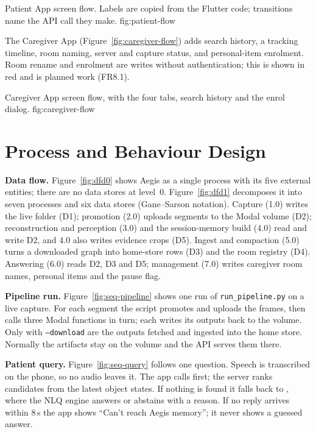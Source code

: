   {Patient App screen flow. Labels are copied from the Flutter code;
   transitions name the API call they make.}
  {fig:patient-flow}

The Caregiver App (Figure~\ref{fig:caregiver-flow}) adds search history, a
tracking timeline, room naming, server and capture status, and personal-item
enrolment. Room rename and enrolment are writes without authentication; this is
shown in red and is planned work (FR8.1).

  {Caregiver App screen flow, with the four tabs, search history and the enrol
   dialog.}
  {fig:caregiver-flow}

\section{Process and Behaviour Design}
\label{sec:behaviour}
\textbf{Data flow.} Figure~\ref{fig:dfd0} shows Aegis as a single process with
its five external entities; there are no data stores at level~0.
Figure~\ref{fig:dfd1} decomposes it into seven processes and six data stores
(Gane--Sarson notation). Capture (1.0) writes the live folder (D1); promotion
(2.0) uploads segments to the Modal volume (D2); reconstruction and perception
(3.0) and the session-memory build (4.0) read and write D2, and 4.0 also writes
evidence crops (D5). Ingest and compaction (5.0) turns a downloaded graph into
home-store rows (D3) and the room registry (D4). Answering (6.0) reads D2, D3
and D5; management (7.0) writes caregiver room names, personal items and the
pause flag.


\textbf{Pipeline run.} Figure~\ref{fig:seq-pipeline} shows one run of
\texttt{run\_pipeline.py} on a live capture. For each segment the script
promotes and uploads the frames, then calls three Modal functions in turn; each
writes its outputs back to the volume. Only with \texttt{--download} are the
outputs fetched and ingested into the home store. Normally the artifacts stay on
the volume and the API serves them there.


\textbf{Patient query.} Figure~\ref{fig:seq-query} follows one question. Speech
is transcribed on the phone, so no audio leaves it. The app calls
 first; the server ranks candidates from the latest object
states. If nothing is found it falls back to , where the NLQ engine
answers or abstains with a reason. If no reply arrives within 8\,s the app shows
``Can't reach Aegis memory''; it never shows a guessed answer.

